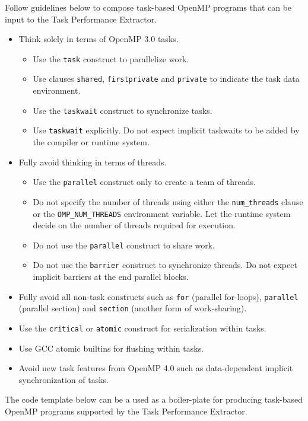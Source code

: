 \documentclass[11pt,a4paper]{article}
\begin{document}
Follow guidelines below to compose task-based OpenMP programs that can be input to the Task Performance Extractor.

\begin{itemize}
    \item Think solely in terms of OpenMP 3.0 tasks.
    \begin{itemize}
        \item Use the \texttt{task} construct to parallelize work.
        \item Use clauses \texttt{shared}, \texttt{firstprivate} and \texttt{private} to indicate the task data environment.
        \item Use the \texttt{taskwait} construct to synchronize tasks.
        \item Use \texttt{taskwait} explicitly. Do not expect implicit taskwaits to be added by the compiler or runtime system.
    \end{itemize}
    \item Fully avoid thinking in terms of threads.
    \begin{itemize}
        \item Use the \texttt{parallel} construct only to create a team of threads.
        \item Do not specify the number of threads using either the \texttt{num\_threads} clause or the \texttt{OMP\_NUM\_THREADS} environment variable. Let the runtime system decide on the number of threads required for execution.
        \item Do not use the \texttt{parallel} construct to share work.
        \item Do not use the \texttt{barrier} construct to synchronize threads. Do not expect implicit barriers at the end parallel blocks.
    \end{itemize}
\item Fully avoid all non-task constructs such as \texttt{for} (parallel for-loops), \texttt{parallel} (parallel section) and \texttt{section} (another form of work-sharing).
\item Use the \texttt{critical} or \texttt{atomic} construct for serialization within tasks.
    \item Use GCC atomic builtins for flushing within tasks.
    \item Avoid new task features from OpenMP 4.0 such as data-dependent implicit synchronization of tasks.
\end{itemize}

The code template below can be a used as a boiler-plate for producing task-based OpenMP programs supported by the Task Performance Extractor.
\end{document}
